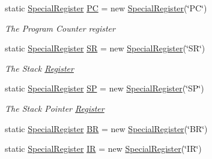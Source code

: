 \begin{DoxyCompactItemize}
\item 
static \hyperlink{class_c_p_u___o_s___simulator_1_1_c_p_u_1_1_special_register}{Special\+Register} \hyperlink{class_c_p_u___o_s___simulator_1_1_c_p_u_1_1_special_register_afc3205003157a5f135752e6a4f8ffb8a}{P\+C} = new \hyperlink{class_c_p_u___o_s___simulator_1_1_c_p_u_1_1_special_register}{Special\+Register}(\char`\"{}P\+C\char`\"{})
\begin{DoxyCompactList}\small\item\em The Program Counter register \end{DoxyCompactList}\item 
static \hyperlink{class_c_p_u___o_s___simulator_1_1_c_p_u_1_1_special_register}{Special\+Register} \hyperlink{class_c_p_u___o_s___simulator_1_1_c_p_u_1_1_special_register_a556243e1c3c891e685bf884771c1575c}{S\+R} = new \hyperlink{class_c_p_u___o_s___simulator_1_1_c_p_u_1_1_special_register}{Special\+Register}(\char`\"{}S\+R\char`\"{})
\begin{DoxyCompactList}\small\item\em The Stack \hyperlink{class_c_p_u___o_s___simulator_1_1_c_p_u_1_1_register}{Register} \end{DoxyCompactList}\item 
static \hyperlink{class_c_p_u___o_s___simulator_1_1_c_p_u_1_1_special_register}{Special\+Register} \hyperlink{class_c_p_u___o_s___simulator_1_1_c_p_u_1_1_special_register_ae1699c7972763e73e3f1cfe467cc82e9}{S\+P} = new \hyperlink{class_c_p_u___o_s___simulator_1_1_c_p_u_1_1_special_register}{Special\+Register}(\char`\"{}S\+P\char`\"{})
\begin{DoxyCompactList}\small\item\em The Stack Pointer \hyperlink{class_c_p_u___o_s___simulator_1_1_c_p_u_1_1_register}{Register} \end{DoxyCompactList}\item 
static \hyperlink{class_c_p_u___o_s___simulator_1_1_c_p_u_1_1_special_register}{Special\+Register} \hyperlink{class_c_p_u___o_s___simulator_1_1_c_p_u_1_1_special_register_a08c44f677cc5e830000382725ce8ab9f}{B\+R} = new \hyperlink{class_c_p_u___o_s___simulator_1_1_c_p_u_1_1_special_register}{Special\+Register}(\char`\"{}B\+R\char`\"{})
\item 
static \hyperlink{class_c_p_u___o_s___simulator_1_1_c_p_u_1_1_special_register}{Special\+Register} \hyperlink{class_c_p_u___o_s___simulator_1_1_c_p_u_1_1_special_register_a96fde61578e06f00ab7b19a4b05b9885}{I\+R} = new \hyperlink{class_c_p_u___o_s___simulator_1_1_c_p_u_1_1_special_register}{Special\+Register}(\char`\"{}I\+R\char`\"{})

\end{DoxyCompactItemize}
